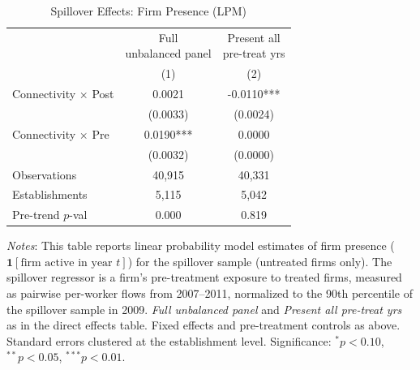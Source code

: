 \begin{table}[H]
\centering
\scriptsize
\caption{Spillover Effects: Firm Presence (LPM)}
\begin{tabular}{lcc}
\toprule
& \shortstack{Full\\unbalanced panel} & \shortstack{Present all\\pre-treat yrs} \\
& (1) & (2) \\
\midrule
Connectivity $\times$ Post & 0.0021 & -0.0110*** \\
& (0.0033) & (0.0024) \\[3pt]
Connectivity $\times$ Pre & 0.0190*** & 0.0000 \\
& (0.0032) & (0.0000) \\[3pt]
\midrule
Observations   & 40,915 & 40,331 \\
Establishments & 5,115 & 5,042 \\
Pre-trend $p$-val & 0.000 & 0.819 \\
\bottomrule
\end{tabular}
\begin{minipage}{\textwidth}
\footnotesize
\medskip
\textit{Notes}: This table reports linear probability model estimates of firm presence ($\mathbf{1}[\text{firm active in year } t]$) for the spillover sample (untreated firms only). The spillover regressor is a firm's pre-treatment exposure to treated firms, measured as pairwise per-worker flows from 2007--2011, normalized to the 90th percentile of the spillover sample in 2009. \textit{Full unbalanced panel} and \textit{Present all pre-treat yrs} as in the direct effects table. Fixed effects and pre-treatment controls as above. Standard errors clustered at the establishment level. Significance: $^{*}p{<}0.10$, $^{**}p{<}0.05$, $^{***}p{<}0.01$.
\end{minipage}
\end{table}

